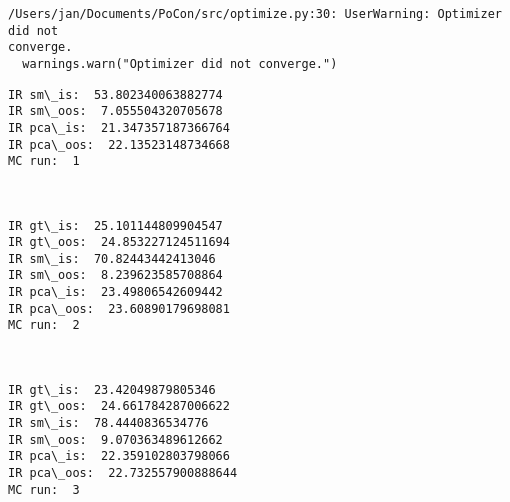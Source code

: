 \documentclass[11pt]{article}
\begin{document}
    \begin{Verbatim}[commandchars=\\\{\},fontsize=\footnotesize]
/Users/jan/Documents/PoCon/src/optimize.py:30: UserWarning: Optimizer did not
converge.
  warnings.warn("Optimizer did not converge.")

    \end{Verbatim}

    \begin{Verbatim}[commandchars=\\\{\},fontsize=\footnotesize]
IR sm\_is:  53.802340063882774
IR sm\_oos:  7.055504320705678
IR pca\_is:  21.347357187366764
IR pca\_oos:  22.13523148734668
MC run:  1

    \end{Verbatim}

    \begin{center}
    \end{center}
    { \hspace*{\fill} \\}
    
    \begin{Verbatim}[commandchars=\\\{\},fontsize=\footnotesize]
IR gt\_is:  25.101144809904547
IR gt\_oos:  24.853227124511694
IR sm\_is:  70.82443442413046
IR sm\_oos:  8.239623585708864
IR pca\_is:  23.49806542609442
IR pca\_oos:  23.60890179698081
MC run:  2

    \end{Verbatim}

    \begin{center}
    \end{center}
    { \hspace*{\fill} \\}
    
    \begin{Verbatim}[commandchars=\\\{\},fontsize=\footnotesize]
IR gt\_is:  23.42049879805346
IR gt\_oos:  24.661784287006622
IR sm\_is:  78.4440836534776
IR sm\_oos:  9.070363489612662
IR pca\_is:  22.359102803798066
IR pca\_oos:  22.732557900888644
MC run:  3

    \end{Verbatim}

    \begin{center}
    \end{center}
    { \hspace*{\fill} \\}
    
\end{document}
